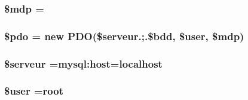 \subsubsection[{\texorpdfstring{\$mdp}{$mdp}}]{\setlength{\rightskip}{0pt plus 5cm}\$mdp =\textquotesingle{}\textquotesingle{}}\hypertarget{maj_g_s_b__main_8php_a8a65334de2f0d486a42b02ecf82fe8fb}{}\label{maj_g_s_b__main_8php_a8a65334de2f0d486a42b02ecf82fe8fb}
\subsubsection[{\texorpdfstring{\$pdo}{$pdo}}]{\setlength{\rightskip}{0pt plus 5cm}\$pdo = new P\+DO(\$serveur.\textquotesingle{};\textquotesingle{}.\$bdd, \$user, \$mdp)}\hypertarget{maj_g_s_b__main_8php_a5766efd703cef0e00bfc06b3f3acbe0e}{}\label{maj_g_s_b__main_8php_a5766efd703cef0e00bfc06b3f3acbe0e}
\subsubsection[{\texorpdfstring{\$serveur}{$serveur}}]{\setlength{\rightskip}{0pt plus 5cm}\$serveur =\textquotesingle{}mysql\+:host=localhost\textquotesingle{}}\hypertarget{maj_g_s_b__main_8php_a4ffb9d7258acf24e1ff550bceba60ed2}{}\label{maj_g_s_b__main_8php_a4ffb9d7258acf24e1ff550bceba60ed2}
\subsubsection[{\texorpdfstring{\$user}{$user}}]{\setlength{\rightskip}{0pt plus 5cm}\$user =\textquotesingle{}root\textquotesingle{}}\hypertarget{maj_g_s_b__main_8php_a598ca4e71b15a1313ec95f0df1027ca5}{}\label{maj_g_s_b__main_8php_a598ca4e71b15a1313ec95f0df1027ca5}
